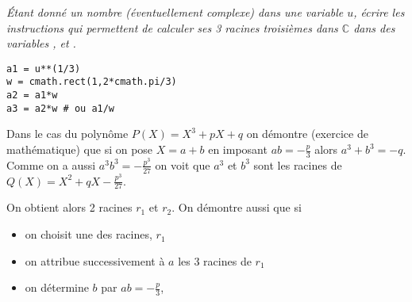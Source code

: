 \begin{Exercise}
{\it Étant donné un nombre (éventuellement complexe) dans une variable $u$, écrire les instructions qui permettent de calculer ses 3 racines troisièmes dans ${\mathbb C}$ dans des variables ,  et .}
\end{Exercise}
\begin{Answer}
\begin{lstlisting}
a1 = u**(1/3)
w = cmath.rect(1,2*cmath.pi/3)
a2 = a1*w
a3 = a2*w # ou a1/w
\end{lstlisting}
\end{Answer}
\medskip

Dans le cas du polynôme $P(X)=X^3+pX+q$ on démontre (exercice de mathématique) que si on pose $X = a+b$ en imposant $ab = -\frac p3$ alors $a^3+b^3 = -q$. Comme on a aussi $a^3b^3 = -\frac {p^3}{27}$ on voit que $a^3$ et $b^3$ sont les racines de $\displaystyle Q(X) = X^2 +qX-\frac {p^3}{27}$.

On obtient alors 2 racines $r_1$ et $r_2$. On démontre aussi que si

\begin{itemize}
    \item on choisit une des racines, $r_1$
    \item on attribue successivement à $a$ les 3 racines de $r_1$ 
    \item on détermine $b$ par $ab = -\frac p3$,
\end{itemize} 

